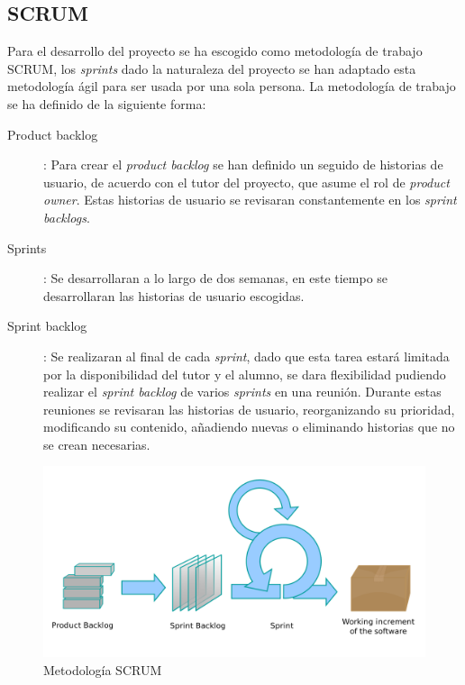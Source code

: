 \documentclass[12pt]{article} %
\begin{document}
\subsection{SCRUM}
Para el desarrollo del proyecto se ha escogido como metodología de trabajo SCRUM, los \textit{sprints} dado la naturaleza del proyecto se han adaptado esta metodología ágil para ser usada por una sola persona. La metodología de trabajo se ha definido de la siguiente forma:
\begin{description}
	\item[Product backlog]:
	\linebreak Para crear el \textit{product backlog} se han definido un seguido de historias de usuario, de acuerdo con el tutor del proyecto, que asume el rol de \textit{product owner}. Estas historias de usuario se revisaran constantemente en los \textit{sprint backlogs}.
	\item[Sprints]:
	\linebreak Se desarrollaran a lo largo de dos semanas, en este tiempo se desarrollaran las historias de usuario escogidas.
	\item[Sprint backlog]:
	\linebreak Se realizaran al final de cada \textit{sprint}, dado que esta tarea estará limitada por la disponibilidad del tutor y el alumno, se dara flexibilidad pudiendo realizar el \textit{sprint backlog} de varios \textit{sprints} en una reunión. Durante estas reuniones se revisaran las historias de usuario, reorganizando su prioridad, modificando su contenido, añadiendo nuevas o eliminando historias que no se crean necesarias.
\end{description}

\begin{figure}[ht!]
\center
\includegraphics[scale=0.2]{Scrum_process.png}
\caption{Metodología SCRUM}
\label{fig:scrum}
\end{figure}
\end{document}

